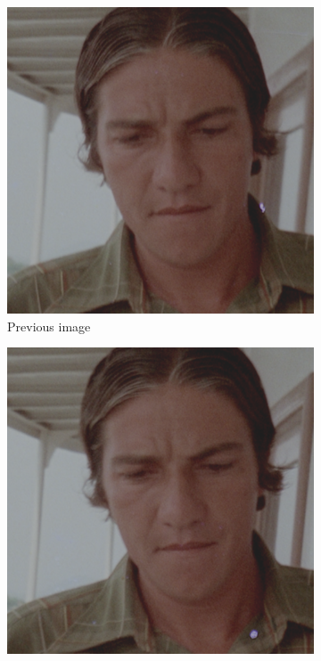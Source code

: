 \begin{figure}[H]
	\centering
	\begin{subfigure}{.3\textwidth}
		\centering
		\includegraphics[width=\linewidth]{warp/previous.png}
		\caption[figure]{Previous image}
		\label{fig:warp_prev}
	\end{subfigure}
	\begin{subfigure}{.3\textwidth}
		\centering
		\includegraphics[width=\linewidth]{warp/input.png}

\end{subfigure}
\end{figure}
